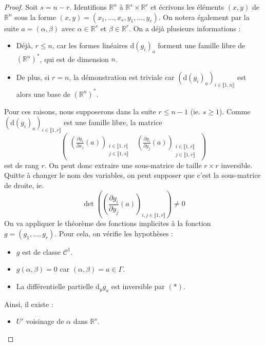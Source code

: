 	\begin{proof}
		Soit $s = n-r$. Identifions $\mathbb{R}^n$ à $\mathbb{R}^s \times \mathbb{R}^r$ et écrivons les éléments $(x, y)$ de $\mathbb{R}^n$ sous la forme $(x, y) = (x_1, \dots, x_s, y_1, \dots, y_r)$. On notera également par la suite $a = (\alpha, \beta)$ avec $\alpha \in \mathbb{R}^s$ et $\beta \in \mathbb{R}^r$. On a déjà plusieurs informations :
		\begin{itemize}
			\item Déjà, $r \leq n$, car les formes linéaires $\mathrm{d}(g_i)_a$ forment une famille libre de $(\mathbb{R}^n)^*$, qui est de dimension $n$.
			\item De plus, si $r = n$, la démonstration est triviale car $(\mathrm{d}(g_i)_a)_{i \in \llbracket 1, n \rrbracket}$ est alors une base de $(\mathbb{R}^n)^*$.
		\end{itemize}
		Pour ces raisons, nous supposerons dans la suite $r \leq n-1$ (ie. $s \geq 1$).
		\newpar
		Comme $(\mathrm{d}(g_i)_a)_{i \in \llbracket 1, r \rrbracket}$ est une famille libre, la matrice
		\[ \begin{pmatrix}
			\left( \frac{\partial g_i}{\partial x_j}(a) \right)_{\substack{i \in \llbracket 1, r \rrbracket \\ j \in \llbracket 1, s \rrbracket}} & \left( \frac{\partial g_i}{\partial y_j}(a) \right)_{\substack{i \in \llbracket 1, r \rrbracket \\ j \in \llbracket 1, r \rrbracket}}
		\end{pmatrix} \]
		est de rang $r$. On peut donc extraire une sous-matrice de taille $r \times r$ inversible. Quitte à changer le nom des variables, on peut supposer que c'est la sous-matrice de droite, ie.
		\[ \det \left( \left( \frac{\partial g_i}{\partial y_j}(a) \right)_{i, j \in \llbracket 1, r \rrbracket} \right) \neq 0 \tag{$*$} \]
		On va appliquer le théorème des fonctions implicites à la fonction $g = (g_1, \dots, g_r)$. Pour cela, on vérifie les hypothèses :
		\begin{itemize}
			\item $g$ est de classe $\mathcal{C}^1$.
			\item $g(\alpha, \beta) = 0$ car $(\alpha, \beta) = a \in \Gamma$.
			\item La différentielle partielle $\mathrm{d}_y g_a$ est inversible par $(*)$.
		\end{itemize}
		Ainsi, il existe :
		\begin{itemize}
			\item $U'$ voisinage de $\alpha$ dans $\mathbb{R}^s$.

\end{itemize}
\end{proof}
